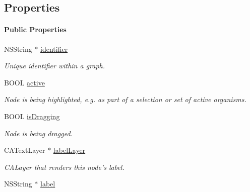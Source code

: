 \subsection*{Properties}
\begin{Indent}\paragraph*{Public Properties}
\begin{DoxyCompactItemize}
\item 
\hypertarget{interface_p_c_graph_node_affbd786aa24e6e474f206de54d866dcd}{
NSString $\ast$ \hyperlink{interface_p_c_graph_node_affbd786aa24e6e474f206de54d866dcd}{identifier}}
\label{interface_p_c_graph_node_affbd786aa24e6e474f206de54d866dcd}

\begin{DoxyCompactList}\small\item\em Unique identifier within a graph. \end{DoxyCompactList}\item 
\hypertarget{interface_p_c_graph_node_a3c788254d0a60c4c0d409c3bbe779821}{
BOOL \hyperlink{interface_p_c_graph_node_a3c788254d0a60c4c0d409c3bbe779821}{active}}
\label{interface_p_c_graph_node_a3c788254d0a60c4c0d409c3bbe779821}

\begin{DoxyCompactList}\small\item\em Node is being highlighted, e.g. as part of a selection or set of active organisms. \end{DoxyCompactList}\item 
\hypertarget{interface_p_c_graph_node_a2e4ab22a0d926eb5c92badcf28c9515e}{
BOOL \hyperlink{interface_p_c_graph_node_a2e4ab22a0d926eb5c92badcf28c9515e}{isDragging}}
\label{interface_p_c_graph_node_a2e4ab22a0d926eb5c92badcf28c9515e}

\begin{DoxyCompactList}\small\item\em Node is being dragged. \end{DoxyCompactList}\item 
\hypertarget{interface_p_c_graph_node_a18054c9c25b29e105ba2df320400f5ef}{
CATextLayer $\ast$ \hyperlink{interface_p_c_graph_node_a18054c9c25b29e105ba2df320400f5ef}{labelLayer}}
\label{interface_p_c_graph_node_a18054c9c25b29e105ba2df320400f5ef}

\begin{DoxyCompactList}\small\item\em CALayer that renders this node's label. \end{DoxyCompactList}\item 
\hypertarget{interface_p_c_graph_node_a3607c7d7cb645a7efbd131683e33140e}{
NSString $\ast$ \hyperlink{interface_p_c_graph_node_a3607c7d7cb645a7efbd131683e33140e}{label}}
\label{interface_p_c_graph_node_a3607c7d7cb645a7efbd131683e33140e}


\end{DoxyCompactItemize}
\end{Indent}
